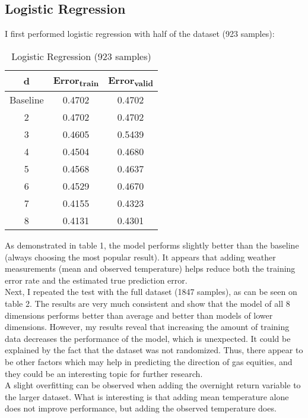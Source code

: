 \documentclass[conference,letterpaper]{IEEEtran}
\begin{document}

\subsection{Logistic Regression}
I first performed logistic regression with half of the dataset (923 samples):

\begin{table}[h]
\renewcommand{\arraystretch}{1.2}
\renewcommand{\thefootnote}{\alph{footnote}}
\caption{Logistic Regression (923 samples)} \label{table1}
\begin{minipage} {0.5\textwidth}
\begin{center}
    \begin{tabular}{ | c | c | c |}
    \hline
    d & Error\textsubscript{train} & Error\textsubscript{valid} \\ \hline
    Baseline & 0.4702 & 0.4702 \\ \hline
    2 & 0.4702 & 0.4702 \\ \hline
    3 & 0.4605 & 0.5439 \\ \hline
    4 & 0.4504 & 0.4680 \\ \hline
    5 & 0.4568 & 0.4637 \\ \hline
    6 & 0.4529 & 0.4670 \\ \hline
    7 & 0.4155 & 0.4323 \\ \hline
    8 & 0.4131 & 0.4301 \\ \hline
    \end{tabular}
\end{center}
\end{minipage}
\end{table}

As demonstrated in table 1, the model performs slightly better than the baseline (always choosing the most popular result). It appears that adding weather measurements (mean and
observed temperature) helps reduce both the training error rate and the estimated true prediction error.\\
\indent Next, I repeated the test with the full dataset (1847 samples), as can be seen on table 2. The results are very much consistent and show that the model of all 8
dimensions performs better than average and better than models of lower dimensions. However, my results reveal that increasing the amount of training data decreases the
performance of the model, which is unexpected. It could be explained by the fact that the dataset was not randomized. Thus, there appear to be other factors which may
help in predicting the direction of gas equities, and they could be an interesting topic for further research. \\
\indent A slight overfitting can be observed when adding the overnight return variable to the larger dataset. What is interesting
is that adding mean temperature alone does not improve performance, but adding the observed temperature does. \\
\end{document}
